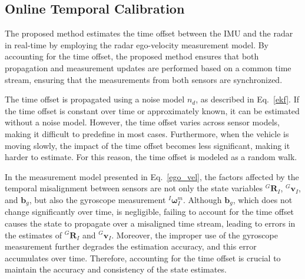 \subsection{Online Temporal Calibration}
\label{sec: online temporal calibration}
The proposed method estimates the time offset between the IMU and the radar in real-time by employing the radar ego-velocity measurement model. By accounting for the time offset, the proposed method ensures that both propagation and measurement updates are performed based on a common time stream, ensuring that the measurements from both sensors are synchronized.

The time offset is propagated using a noise model \( n_d \), as described in Eq.~\eqref{ekf}. If the time offset is constant over time or approximately known, it can be estimated without a noise model. However, the time offset varies across sensor models, making it difficult to predefine in most cases. Furthermore, when the vehicle is moving slowly, the impact of the time offset becomes less significant, making it harder to estimate. For this reason, the time offset is modeled as a random walk.

In the measurement model presented in Eq.~\eqref{ego_vel}, the factors affected by the temporal misalignment between sensors are not only the state variables \( {}^G\mathbf{R}_I \), \( {}^G\mathbf{v}_I \), and \( \mathbf{b}_g \), but also the gyroscope measurement \( {}^I\boldsymbol{\omega}_I^m \). Although \( \mathbf{b}_g \), which does not change significantly over time, is negligible, failing to account for the time offset causes the state to propagate over a misaligned time stream, leading to errors in the estimates of \( {}^G\mathbf{R}_I \) and \( {}^G\mathbf{v}_I \). Moreover, the improper use of the gyroscope measurement further degrades the estimation accuracy, and this error accumulates over time. Therefore, accounting for the time offset is crucial to maintain the accuracy and consistency of the state estimates.